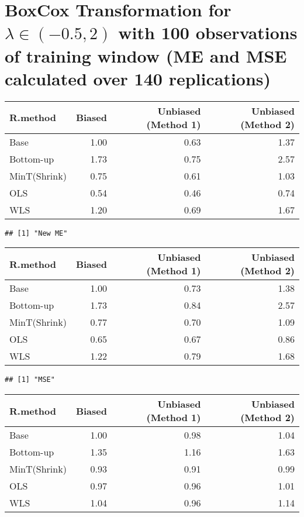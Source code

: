 \documentclass[
]{article}
\begin{document}
\newpage

\hypertarget{boxcox-transformation-for-lambda-in--0.52-with-100-observations-of-training-window-me-and-mse-calculated-over-140-replications}{%
\section{\texorpdfstring{BoxCox Transformation for
\(\lambda \in (-0.5,2)\) with 100 observations of training window (ME
and MSE calculated over 140
replications)}{BoxCox Transformation for \textbackslash lambda \textbackslash in (-0.5,2) with 100 observations of training window (ME and MSE calculated over 140 replications)}}\label{boxcox-transformation-for-lambda-in--0.52-with-100-observations-of-training-window-me-and-mse-calculated-over-140-replications}}

\begin{tabular}{l|r|r|r}
\hline
R.method & Biased & Unbiased (Method 1) & Unbiased (Method 2)\\
\hline
Base & 1.00 & 0.63 & 1.37\\
\hline
Bottom-up & 1.73 & 0.75 & 2.57\\
\hline
MinT(Shrink) & 0.75 & 0.61 & 1.03\\
\hline
OLS & 0.54 & 0.46 & 0.74\\
\hline
WLS & 1.20 & 0.69 & 1.67\\
\hline
\end{tabular}

\begin{verbatim}
## [1] "New ME"
\end{verbatim}

\begin{tabular}{l|r|r|r}
\hline
R.method & Biased & Unbiased (Method 1) & Unbiased (Method 2)\\
\hline
Base & 1.00 & 0.73 & 1.38\\
\hline
Bottom-up & 1.73 & 0.84 & 2.57\\
\hline
MinT(Shrink) & 0.77 & 0.70 & 1.09\\
\hline
OLS & 0.65 & 0.67 & 0.86\\
\hline
WLS & 1.22 & 0.79 & 1.68\\
\hline
\end{tabular}

\begin{verbatim}
## [1] "MSE"
\end{verbatim}

\begin{tabular}{l|r|r|r}
\hline
R.method & Biased & Unbiased (Method 1) & Unbiased (Method 2)\\
\hline
Base & 1.00 & 0.98 & 1.04\\
\hline
Bottom-up & 1.35 & 1.16 & 1.63\\
\hline
MinT(Shrink) & 0.93 & 0.91 & 0.99\\
\hline
OLS & 0.97 & 0.96 & 1.01\\
\hline
WLS & 1.04 & 0.96 & 1.14\\
\hline
\end{tabular}
\end{document}
